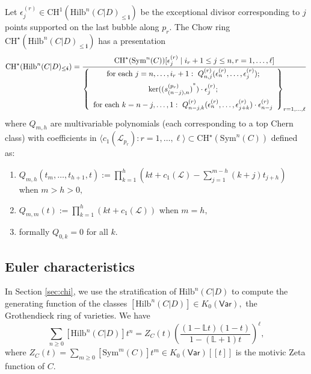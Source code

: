 \documentclass[10.5pt]{amsart}
\theoremstyle{definition}
\newenvironment{customthm}[1]
  {\renewcommand\theinnercustomthm{#1}\innercustomthm}
  {\endinnercustomthm}
\theoremstyle{definition}
\theoremstyle{definition}
\theoremstyle{definition}
\newcommand{\Hilb}{\mathrm{Hilb}}
\newcommand{\Sym}{\mathrm{Sym}}
\newcommand{\CH}{\mathrm{CH}}
\newcommand{\bi}{\boldsymbol{i}}
\begin{document}
\begin{customthm}{\ref{thm:chowringD}}
    Let $\epsilon_{j}^{(r)}\in \CH^1(\Hilb^{n}(C|D)_{\leq \bi})$ be the exceptional divisor corresponding to $j$ points supported on the last bubble along $p_r.$ The Chow ring $\mathrm{CH}^\star(\Hilb^n(C|D)_{\leq \bi})$ has a presentation $$\mathrm{CH}^\star(\Hilb^n(C|D)_{\leq \bi}) = \frac{\mathrm{CH}^\star(\mathrm{Sym}^n(C))[\epsilon^{(r)}_{j}\mid i_r+1\leq j\leq n, r = 1,\dots, \ell]}{\left\{\begin{array}{c}
   \text{for each }j = n, \dots, i_r+1:\  Q_{n,j}^{(r)}(\epsilon^{(r)}_{n},\dots,\epsilon^{(r)}_{j}); \vspace{5pt}\\  \ker({(s^{(p_r)}_{(n-j), n})}^*) \cdot \epsilon^{(r)}_{j}; \vspace{5pt}\\  \text{for each } k = n-j, \dots, 1: \ Q_{n-j,k}^{(r)}(\epsilon^{(r)}_{n},\dots, \epsilon^{(r)}_{j+k})\cdot\epsilon^{(r)}_{n-j} 
  \end{array}\right\}_{r = 1,\dots, \ell}}$$ where $Q_{m,h}$ are multivariable polynomials (each corresponding to a top Chern class) with coefficients in $\langle c_1(\mathcal{L}_{p_r}): r = 1,\dots, \ell\rangle\subset\CH^\star(\Sym^n(C))$ defined as: \begin{enumerate}
      \item $Q_{m,h}(t_m, \dots, t_{h+1}, t):=\prod_{k=1}^h (kt + c_1(\mathcal{L})-\sum_{j=1}^{m-h}(k+j)t_{j+h})$ when $m>h>0,$
      \item $Q_{m,m}(t):=\prod_{k=1}^h (kt + c_1(\mathcal{L}))$ when $m = h,$
      \item formally $Q_{0, k} = 0$ for all $k.$
  \end{enumerate}
\end{customthm}

\subsection{Euler characteristics} In Section \ref{sec:chi}, we use the stratification of $\Hilb^n(C|D)$ to compute the generating function of the classes $[\Hilb^n(C|D)]\in K_0(\mathsf{Var}),$ the Grothendieck ring of varieties.
\begin{customthm}{\ref{thm:chi}}
    We have $$\sum_{n\geq 0}[\Hilb^n(C|D)] t^n = Z_C(t)\left(\frac{(1-\mathbb{L}t)(1-t)}{1-(\mathbb{L}+1)t}\right)^\ell,$$ where $Z_C(t)= \sum_{m\geq 0} [\mathrm{Sym}^m(C)] t^m\in K_0(\mathsf{Var})[\![t]\!]$ is the motivic Zeta function of $C.$
\end{customthm}
\end{document}
